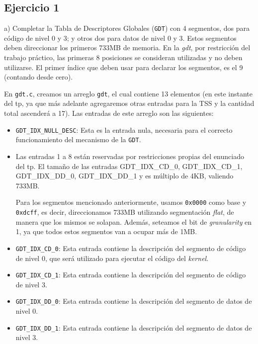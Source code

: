 \subsection*{Ejercicio 1}
\vspace*{0.5cm} 

\noindent
a) Completar la Tabla de Descriptores Globales (\verb|GDT|) con 4 segmentos, dos para código de
nivel 0 y 3; y otros dos para datos de nivel 0 y 3. Estos segmentos deben direccionar los
primeros 733MB de memoria. En la \textit{gdt}, por restricción del trabajo práctico, las primeras 
8 posiciones se consideran utilizadas y no deben utilizarse. El primer índice que deben usar
para declarar los segmentos, es el 9 (contando desde cero).

\vspace*{0.3cm}

En \verb|gdt.c|, creamos un arreglo \verb|gdt|, el cual contiene 13 elementos (en este instante del tp, ya 
que más adelante agregaremos otras entradas para la TSS y la cantidad total ascender\'a a 17).  
Las entradas de este arreglo son las siguientes: 

\begin{itemize}

  \item \verb|GDT_IDX_NULL_DESC|: Esta es la entrada nula, 
necesaria para el correcto funcionamiento del mecanismo de la \verb|GDT|.

  \item Las entradas 1 a 8 est\'an reservadas por restricciones propias del enunciado del tp. 
  El tama\~no de las entradas GDT_IDX_CD_0, GDT_IDX_CD_1, GDT_IDX_DD_0, GDT_IDX_DD_1 y es 
  m\'ultiplo de 4KB, valiendo 733MB.
  
  Para los segmentos mencionado anteriormente, usamos \verb|0x0000| como base y \verb|0xdcff|, es 
  decir, direccionamos 733MB utilizando segmentación \textit{flat}, de manera que los mismos se solapan. 
  Además, seteamos el bit de \textit{granularity} en 1, ya que todos estos segmentos van a ocupar más de 1MB.

  \item \verb|GDT_IDX_CD_0|: Esta entrada contiene la descripci\'on del segmento de c\'odigo de nivel 0,
  que ser\'a utilizado para ejecutar el c\'odigo del \textit{kernel}. 

  \item \verb|GDT_IDX_CD_1|: Esta entrada contiene la descripci\'on del segmento de c\'odigo de nivel 3. 

  \item \verb|GDT_IDX_DD_0|: Esta entrada contiene la descripci\'on del segmento de datos de nivel 0.

  \item \verb|GDT_IDX_DD_1|: Esta entrada contiene la descripci\'on del segmento de datos de nivel 3.

\end{itemize}



